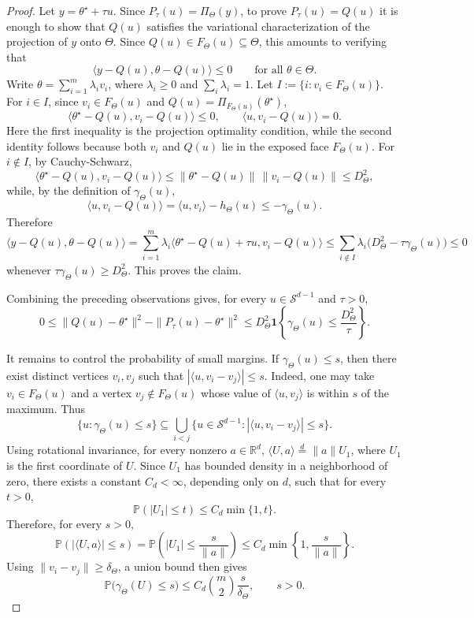 \documentclass[11pt]{article}
\theoremstyle{plain}
\theoremstyle{definition}
\providecommand{\mathbbm}{\mathbb} %
\newcommand{\R}{\mathbbm{R}}
\renewcommand{\P}{\mathbb{P}}
\newcommand{\mcS}{\mathcal{S}}
\begin{document}
\begin{proof}
Let $y=\theta^\star+\tau u$. Since $P_\tau(u)=\Pi_\Theta(y)$, to prove $P_\tau(u)=Q(u)$ it is enough
to show that $Q(u)$ satisfies the variational characterization of the
projection of $y$ onto $\Theta$. Since $Q(u)\in F_\Theta(u)\subseteq\Theta$,
this amounts to verifying that
\[
    \langle y-Q(u),\theta-Q(u)\rangle\le0
    \qquad
    \text{for all }\theta\in\Theta.
\]
Write $\theta=\sum_{i=1}^m\lambda_i v_i$, where
$\lambda_i\ge0$ and $\sum_i\lambda_i=1$. Let $I:=\{i:v_i\in F_\Theta(u)\}$. For $i\in I$, since $v_i\in F_\Theta(u)$ and
$Q(u)=\Pi_{F_\Theta(u)}(\theta^\star)$,
\[
    \langle \theta^\star-Q(u),v_i-Q(u)\rangle\le0,
    \qquad
    \langle u,v_i-Q(u)\rangle=0.
\]
Here the first inequality is the projection optimality condition, while the
second identity follows because both $v_i$ and $Q(u)$ lie in the exposed
face $F_\Theta(u)$. 
For $i\notin I$, by Cauchy-Schwarz,
\[
    \langle \theta^\star-Q(u),v_i-Q(u)\rangle
    \le
    \|\theta^\star-Q(u)\|\,\|v_i-Q(u)\|
    \le
    D_{\Theta}^2,
\]
while, by the definition of $\gamma_\Theta(u)$,
\[
    \langle u,v_i-Q(u)\rangle
    =
    \langle u,v_i\rangle-h_\Theta(u)
    \le
    -\gamma_\Theta(u).
\]
Therefore
\[
    \langle y-Q(u),\theta-Q(u)\rangle
    =
    \sum_{i=1}^m
    \lambda_i
    \langle \theta^\star-Q(u)+\tau u,v_i-Q(u)\rangle
    \le
    \sum_{i\notin I}
    \lambda_i
    \bigl(D_{\Theta}^2-\tau\gamma_\Theta(u)\bigr)
    \le0
\]
whenever $\tau\gamma_\Theta(u)\ge D_{\Theta}^2$. This proves the claim.

Combining the preceding observations gives, for every $u\in\mcS^{d-1}$
and $\tau>0$,
\[
    0
    \le
    \|Q(u)-\theta^\star\|^2
    -
    \|P_\tau(u)-\theta^\star\|^2
    \le
    D_{\Theta}^2
    \mathbf 1
    \left\{
        \gamma_\Theta(u)
        \le
        \frac{D_{\Theta}^2}{\tau}
    \right\}.
\]

It remains to control the probability of small margins. If
$\gamma_\Theta(u)\le s$, then there exist distinct vertices $v_i,v_j$ such
that $|\langle u,v_i-v_j\rangle|\le s$. Indeed, one may take $v_i\in F_\Theta(u)$ and a vertex $v_j\notin F_\Theta(u)$
whose value of $\langle u,v_j\rangle$ is within $s$ of the maximum. Thus
\[
    \{u:\gamma_\Theta(u)\le s\}
    \subseteq
    \bigcup_{i<j}
    \{
        u\in\mcS^{d-1}:
        |\langle u,v_i-v_j\rangle|\le s
    \}.
\]
Using rotational invariance, for every nonzero $a\in\R^d$, $\langle U,a\rangle
\stackrel{d}{=}\|a\|U_1$,
where $U_1$ is the first coordinate of $U$. Since $U_1$ has bounded density in a neighborhood of zero, there exists a constant $C_d<\infty$, depending only on $d$, such that for every $t>0$,
\[
    \P(|U_1|\le t)\le C_d\min\{1,t\}.
\]
Therefore, for every $s>0$,
\[
    \P(|\langle U,a\rangle|\le s)
    =
    \P\left(|U_1|\le \frac{s}{\|a\|}\right)
    \le
    C_d\min\left\{1,\frac{s}{\|a\|}\right\}.
\]
Using $\|v_i-v_j\| \ge \delta_{\Theta}$, a union bound then gives
\[
    \P\bigl(\gamma_\Theta(U)\le s\bigr)
    \le
    C_d \binom{m}{2}\frac{s}{\delta_\Theta},
    \qquad s>0.
\]


\end{proof}
\end{document}
